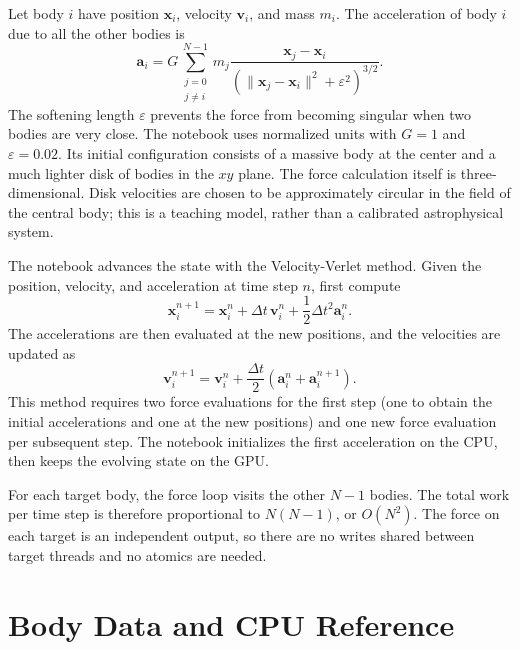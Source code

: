 Let body $i$ have position $\mathbf{x}_i$, velocity $\mathbf{v}_i$, and mass
$m_i$. The acceleration of body $i$ due to all the other bodies is
\begin{equation}
\mathbf{a}_i = G \sum_{\substack{j=0\\j\ne i}}^{N-1} m_j
\frac{\mathbf{x}_j-\mathbf{x}_i}
     {\left(\|\mathbf{x}_j-\mathbf{x}_i\|^2+\varepsilon^2\right)^{3/2}}.
\label{eq:nbody-force}
\end{equation}
The softening length $\varepsilon$ prevents the force from becoming singular
when two bodies are very close. The notebook uses normalized units with
$G=1$ and $\varepsilon=0.02$. Its initial configuration consists of a massive
body at the center and a much lighter disk of bodies in the $xy$ plane. The
force calculation itself is three-dimensional. Disk velocities are chosen to
be approximately circular in the field of the central body; this is a
teaching model, rather than a calibrated astrophysical system.

The notebook advances the state with the Velocity-Verlet method. Given the
position, velocity, and acceleration at time step $n$, first compute
\begin{equation}
\mathbf{x}_i^{n+1} = \mathbf{x}_i^n + \Delta t\,\mathbf{v}_i^n
             + \frac{1}{2}\Delta t^2\mathbf{a}_i^n.
\label{eq:nbody-position-update}
\end{equation}
The accelerations are then evaluated at the new positions, and the velocities
are updated as
\begin{equation}
\mathbf{v}_i^{n+1} = \mathbf{v}_i^n +
   \frac{\Delta t}{2}\left(\mathbf{a}_i^n+\mathbf{a}_i^{n+1}\right).
\label{eq:nbody-velocity-update}
\end{equation}
This method requires two force evaluations for the first step (one to obtain
the initial accelerations and one at the new positions) and one new force
evaluation per subsequent step. The notebook initializes the first
acceleration on the CPU, then keeps the evolving state on the GPU.

For each target body, the force loop visits the other $N-1$ bodies. The total
work per time step is therefore proportional to $N(N-1)$, or $O(N^2)$. The
force on each target is an independent output, so there are no writes shared
between target threads and no atomics are needed.

\section{Body Data and CPU Reference}
\label{sec:nbody-data}

